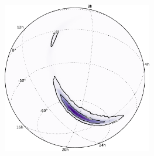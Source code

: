 \documentclass[aspectratio=169]{beamer}
\begin{document}
\begin{frame}
\begin{columns}
            \includegraphics[width=0.49\textwidth]{figures/ligo_lambert-skymap.pdf}
        \end{columns}
    \end{frame}
\end{document}
